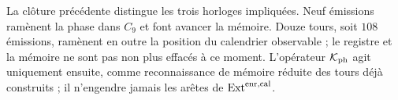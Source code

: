 La clôture précédente distingue les trois horloges impliquées. Neuf émissions
ramènent la phase dans \(C_9\) et font avancer la mémoire. Douze tours, soit
\(108\) émissions, ramènent en outre la position du calendrier observable ;
le registre et la mémoire ne sont pas non plus effacés à ce moment. L’opérateur
\(\mathcal K_{\rm ph}\) agit uniquement ensuite, comme reconnaissance de
mémoire réduite des tours déjà construits ; il n’engendre jamais les arêtes de
\(\operatorname{Ext}^{\rm enr,cal}\).
